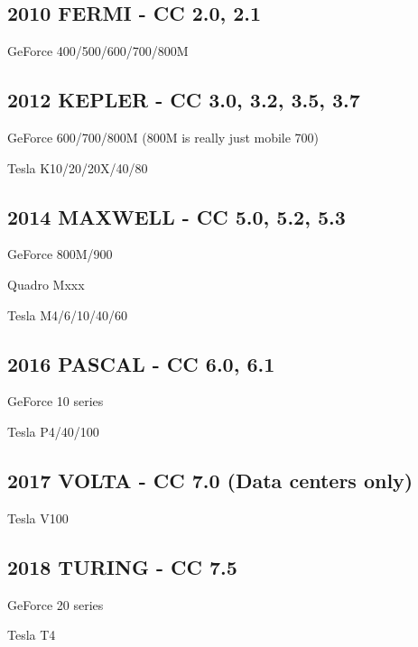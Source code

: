 \documentclass{article}
\begin{document}
\subsection{2010 FERMI - CC 2.0, 2.1 }
\indent \par GeForce 400/500/600/700/800M

\subsection{2012 KEPLER - CC 3.0, 3.2, 3.5, 3.7}
\indent \par GeForce 600/700/800M (800M is really just mobile 700)

Tesla K10/20/20X/40/80

\subsection{2014 MAXWELL - CC 5.0, 5.2, 5.3}
\indent \par GeForce 800M/900

Quadro Mxxx

Tesla M4/6/10/40/60

\subsection{2016 PASCAL - CC 6.0, 6.1}
\indent \par GeForce 10 series

Tesla P4/40/100

\subsection{2017 VOLTA - CC 7.0 (Data centers only)}

\indent \par Tesla V100

\subsection{2018 TURING - CC 7.5}
\indent \par GeForce 20 series

Tesla T4
\end{document}
